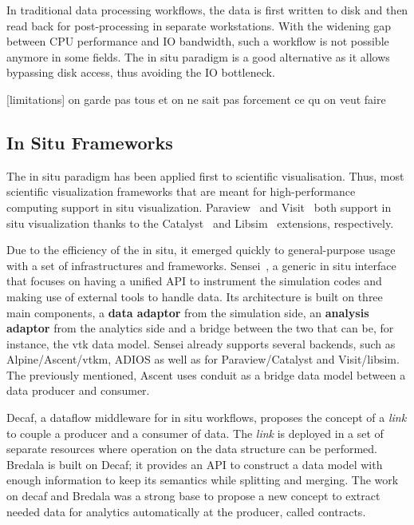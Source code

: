 In traditional data processing workflows, the data is first written to disk and then read back for post-processing in separate workstations. With the widening gap between CPU performance and IO bandwidth, such a workflow is not possible anymore in some fields. The in situ paradigm is a good alternative as it allows bypassing disk access, thus avoiding the IO bottleneck.  

[limitations] on garde pas tous et on ne sait pas forcement ce qu on veut faire 


\subsection{In Situ Frameworks}


The in situ paradigm has been applied first to scientific visualisation\cite{InSituLiuMa:2007}. Thus, most scientific visualization frameworks that are meant for high-performance computing support in situ visualization. Paraview~\cite{ahrens_paraview_2005} and Visit~\cite{childs_visit_nodate} both support in situ visualization thanks to the Catalyst~\cite{catalyst11} and Libsim~\cite{libsim11} extensions, respectively.

Due to the efficiency of the in situ, it emerged quickly to general-purpose usage with a set of infrastructures and frameworks. Sensei~\cite{ayachit_sensei_2016}, a generic in situ interface that focuses on having a unified API to instrument the simulation codes and making use of external tools to handle data. Its architecture is built on three main components, a \textbf{data adaptor} from the simulation side, an \textbf{analysis adaptor} from the analytics side and a bridge between the two that can be, for instance, the vtk data model. Sensei already supports several backends, such as Alpine/Ascent/vtkm\cite{Larsen-alpine-isav17,moreland_vtk-m_2016}, ADIOS\cite{lofstead_insights_2013_adios,boyuka_transparent_2014_adios} as well as for Paraview/Catalyst and Visit/libsim. The previously mentioned, Ascent\cite{Larsen-alpine-isav17} uses conduit\cite{larsen_strawman_2015} as a bridge data model between a data producer and consumer. 

Decaf\cite{dreher_decaf_2017}, a dataflow middleware for in situ workflows, proposes the concept of a \textit{link} to couple a producer and a consumer of data. The \textit{link} is deployed in a set of separate resources where operation on the data structure can be performed. Bredala\cite{dreher_bredala_2016} is built on Decaf; it provides an API to construct a data model with enough information to keep its semantics while splitting and merging. The work on decaf and Bredala was a strong base to propose a new concept to extract needed data for analytics automatically at the producer, called contracts\cite{mommessin_automatic_2017}.

